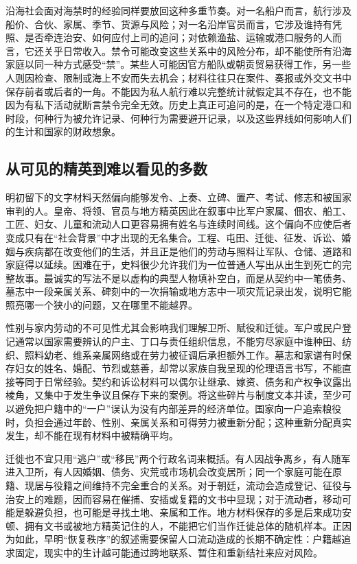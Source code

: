 沿海社会面对海禁时的经验同样要放回这种多重节奏。对一名船户而言，航行涉及船价、合伙、家属、季节、货源与风险；对一名沿岸官员而言，它涉及谁持有凭照、是否牵连治安、如何应付上司的追问；对依赖渔盐、运输或港口服务的人而言，它还关乎日常收入。禁令可能改变这些关系中的风险分布，却不能使所有沿海家庭以同一种方式感受“禁”。某些人可能因官方船队或朝贡贸易获得工作，另一些人则因检查、限制或海上不安而失去机会；材料往往只在案件、奏报或外交文书中保存前者或后者的一角。不能因为私人航行难以完整统计就假定其不存在，也不能因为有私下活动就断言禁令完全无效。历史上真正可追问的是，在一个特定港口和时段，何种行为被允许记录、何种行为需要避开记录，以及这些界线如何影响人们的生计和国家的财政想象。

\subsection{从可见的精英到难以看见的多数}

明初留下的文字材料天然偏向能够发令、上奏、立碑、置产、考试、修志和被国家审判的人。皇帝、将领、官员与地方精英因此在叙事中比军户家属、佃农、船工、工匠、妇女、儿童和流动人口更容易拥有姓名与连续时间线。这个偏向不应使后者变成只有在“社会背景”中才出现的无名集合。工程、屯田、迁徙、征发、诉讼、婚姻与疾病都在改变他们的生活，并且正是他们的劳动与照料让军队、仓储、道路和家庭得以延续。困难在于，史料很少允许我们为一位普通人写出从出生到死亡的完整故事。最诚实的写法不是以虚构的典型人物填补空白，而是从契约中一笔债务、墓志中一段亲属关系、碑刻中的一次捐输或地方志中一项灾荒记录出发，说明它能照亮哪一个狭小的问题，又在哪里不能越界。

性别与家内劳动的不可见性尤其会影响我们理解卫所、赋役和迁徙。军户或民户登记通常以国家需要辨认的户主、丁口与责任组织信息，不能穷尽家庭中谁种田、纺织、照料幼老、维系亲属网络或在劳力被征调后承担额外工作。墓志和家谱有时保存妇女的姓名、婚配、节烈或慈善，却常以家族自我呈现的伦理语言书写，不能直接等同于日常经验。契约和诉讼材料可以偶尔让继承、嫁资、债务和产权争议露出棱角，又集中于发生争议且保存下来的案例。将这些碎片与制度文本并读，至少可以避免把户籍中的“一户”误认为没有内部差异的经济单位。国家向一户追索粮役时，负担会通过年龄、性别、亲属关系和可得劳力被重新分配；这种重新分配真实发生，却不能在现有材料中被精确平均。

迁徙也不宜只用“逃户”或“移民”两个行政名词来概括。有人因战争离乡，有人随军进入卫所，有人因婚姻、债务、灾荒或市场机会改变居所；同一个家庭可能在原籍、现居与役籍之间维持不完全重合的关系。对于朝廷，流动会造成登记、征役与治安上的难题，因而容易在催捕、安插或复籍的文书中显现；对于流动者，移动可能是躲避负担，也可能是寻找土地、亲属和工作。地方材料保存的多是后来成功安顿、拥有文书或被地方精英记住的人，不能把它们当作迁徙总体的随机样本。正因为如此，早明“恢复秩序”的叙述需要保留人口流动造成的长期不确定性：户籍越追求固定，现实中的生计越可能通过跨地联系、暂住和重新结社来应对风险。

